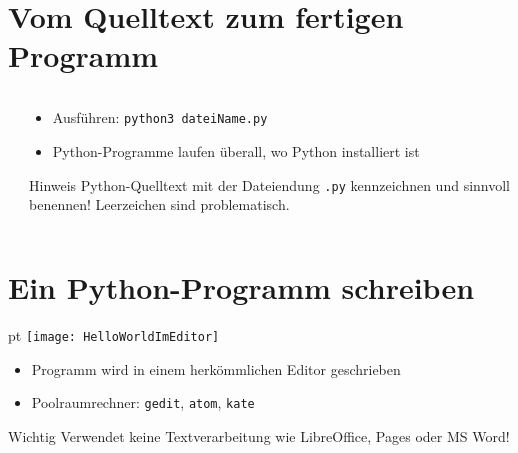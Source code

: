 \section{Vom Quelltext zum fertigen Programm}
\begin{frame}
	\slidehead

	\begin{columns}[T]
		\begin{column}{.4\textwidth}
		\end{column}
		\begin{column}{.6\textwidth}
			\begin{itemize}
				\item Ausführen: \texttt{python3 dateiName.py}
				\item Python-Programme laufen überall, wo Python installiert ist
			\end{itemize}
			\vspace{2.5cm}
			\begin{block}{Hinweis}
				Python-Quelltext mit der Dateiendung \texttt{.py} kennzeichnen und sinnvoll benennen! Leerzeichen sind problematisch.
			\end{block}
		\end{column}
	\end{columns}
\end{frame}

\section{Ein Python-Programm schreiben}
\begin{frame}
	\slidehead

	\begin{center}
		 pt
		\texttt{[image: HelloWorldImEditor]}
	\end{center}

	\begin{itemize}
		\item Programm wird in einem herkömmlichen Editor geschrieben
		\item Poolraumrechner: \texttt{gedit}, \texttt{atom}, \texttt{kate}
	\end{itemize}
	\begin{alertblock}{Wichtig}
		Verwendet keine Textverarbeitung wie LibreOffice, Pages oder MS Word!
	\end{alertblock}
\end{frame}

